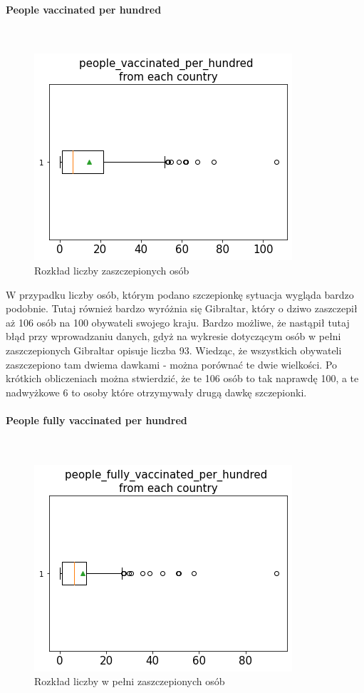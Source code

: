 \documentclass[12pt, oneside]{article}
\begin{document}
\newpage

\paragraph{People vaccinated per hundred}
\mbox{}\\
\begin{figure}[!ht]
\centering
\includegraphics[scale=0.5]{../img/box_people_vaccinated.png} 
\caption{Rozkład liczby zaszczepionych osób}
\label{Rys:boxPeopleVacc}
\end{figure}

W przypadku liczby osób, którym podano szczepionkę sytuacja wygląda bardzo podobnie. Tutaj również bardzo wyróżnia się Gibraltar, który o dziwo zaszczepił aż 106 osób na 100 obywateli swojego kraju. Bardzo możliwe, że nastąpił tutaj błąd przy wprowadzaniu danych, gdyż na wykresie dotyczącym osób w pełni zaszczepionych Gibraltar opisuje liczba 93. Wiedząc, że wszystkich obywateli zaszczepiono tam dwiema dawkami - można porównać te dwie wielkości. Po krótkich obliczeniach można stwierdzić, że te 106 osób to tak naprawdę 100, a te nadwyżkowe 6 to osoby które otrzymywały drugą dawkę szczepionki. 


\paragraph{People fully vaccinated per hundred}
\mbox{}\\
\begin{figure}[h]
\centering
\includegraphics[scale=0.5]{../img/box_fully_vaccinated.png} 
\caption{Rozkład liczby w pełni zaszczepionych osób}
\label{Rys:boxFullyVacc}
\end{figure}
\end{document}
